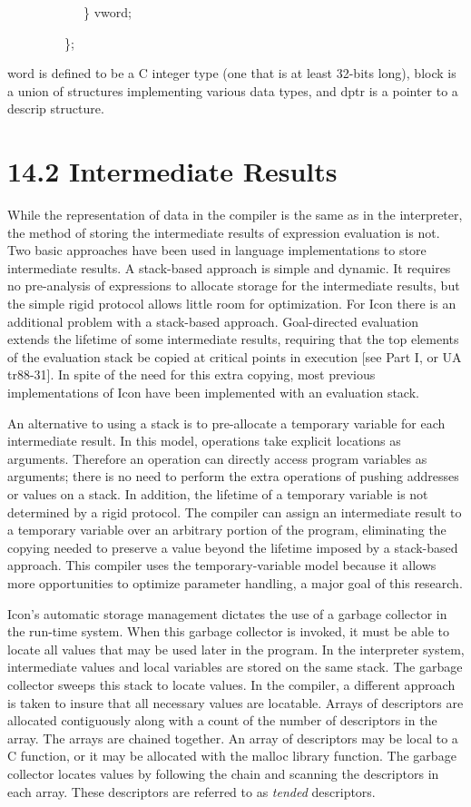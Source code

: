{\ttfamily\mdseries
\ \ \ \ \ \ \ \ \ \ \ \ \} vword;}

{\ttfamily\mdseries
\ \ \ \ \ \ \ \ \ \};}


word is defined to be a C integer type (one that is at least 32-bits long), block is a union of structures implementing
various data types, and dptr is a pointer to a descrip structure. 

\section[14.2 Intermediate Results]{14.2 Intermediate Results}

While the representation of data in the compiler is the same as in the
interpreter, the method of storing the intermediate results of
expression evaluation is not. Two basic approaches have been used in
language implementations to store intermediate results. A stack-based
approach is simple and dynamic. It requires no pre-analysis of
expressions to allocate storage for the intermediate results, but the
simple rigid protocol allows little room for optimization.  For Icon
there is an additional problem with a stack-based
approach. Goal-directed evaluation extends the lifetime of some
intermediate results, requiring that the top elements of the
evaluation stack be copied at critical points in execution [see Part
I, or UA tr88-31]. In spite of the need for this extra copying, most
previous implementations of Icon have been implemented with an
evaluation stack.

An alternative to using a stack is to pre-allocate a temporary
variable for each intermediate result. In this model, operations take
explicit locations as arguments. Therefore an operation can directly
access program variables as arguments; there is no need to perform the
extra operations of pushing addresses or values on a stack. In
addition, the lifetime of a temporary variable is not determined by a
rigid protocol. The compiler can assign an intermediate result to a
temporary variable over an arbitrary portion of the program,
eliminating the copying needed to preserve a value beyond the lifetime
imposed by a stack-based approach. This compiler uses the
temporary-variable model because it allows more opportunities to
optimize parameter handling, a major goal of this research.


Icon's automatic storage management dictates the use of a garbage
collector in the run-time system. When this garbage collector is
invoked, it must be able to locate all values that may be used later
in the program. In the interpreter system, intermediate values and
local variables are stored on the same stack. The garbage collector
sweeps this stack to locate values. In the compiler, a different
approach is taken to insure that all necessary values are locatable.
Arrays of descriptors are allocated contiguously along with a count of
the number of descriptors in the array. The arrays are chained
together. An array of descriptors may be local to a C function, or it
may be allocated with the malloc library function. The garbage
collector locates values by following the chain and scanning the
descriptors in each array. These descriptors are referred to as
\textit{tended} descriptors.

